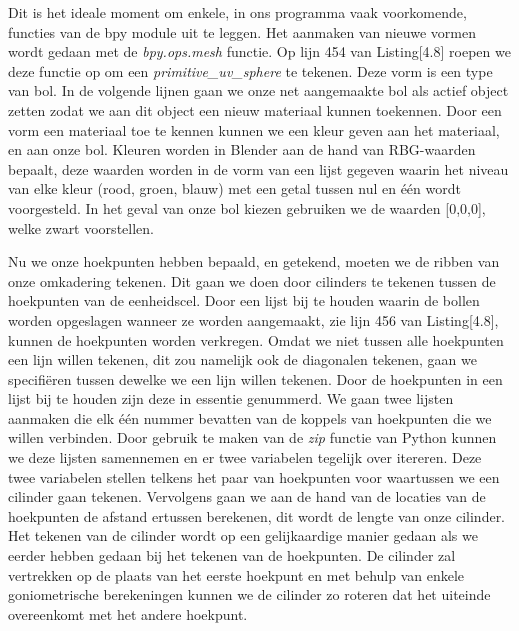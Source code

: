 Dit is het ideale moment om enkele, in ons programma vaak voorkomende, functies van de bpy module uit te leggen. Het aanmaken van nieuwe vormen wordt gedaan met de \textit{bpy.ops.mesh} functie. Op lijn 454 van Listing[4.8] roepen we deze functie op om een \textit{primitive\_uv\_sphere} te tekenen. Deze vorm is een type van bol. In de volgende lijnen gaan we onze net aangemaakte bol als actief object zetten zodat we aan dit object een nieuw materiaal kunnen toekennen. Door een vorm een materiaal toe te kennen kunnen we een kleur geven aan het materiaal, en aan onze bol. Kleuren worden in Blender aan de hand van RBG-waarden bepaalt, deze waarden worden in de vorm van een lijst gegeven waarin het niveau van elke kleur (rood, groen, blauw) met een getal tussen nul en één wordt voorgesteld. In het geval van onze bol kiezen gebruiken we de waarden [0,0,0], welke zwart voorstellen.
\par
Nu we onze hoekpunten hebben bepaald, en getekend, moeten we de ribben van onze omkadering tekenen. Dit gaan we doen door cilinders te tekenen tussen de hoekpunten van de eenheidscel. Door een lijst bij te houden waarin de bollen worden opgeslagen wanneer ze worden aangemaakt, zie lijn 456 van Listing[4.8], kunnen de hoekpunten worden verkregen. Omdat we niet tussen alle hoekpunten een lijn willen tekenen, dit zou namelijk ook de diagonalen tekenen, gaan we specifiëren tussen dewelke we een lijn willen tekenen. Door de hoekpunten in een lijst bij te houden zijn deze in essentie genummerd. We gaan twee lijsten aanmaken die elk één nummer bevatten van de koppels van hoekpunten die we willen verbinden. Door gebruik te maken van de \textit{zip} functie van Python kunnen we deze lijsten samennemen en er twee variabelen tegelijk over itereren. Deze twee variabelen stellen telkens het paar van hoekpunten voor waartussen we een cilinder gaan tekenen. Vervolgens gaan we aan de hand van de locaties van de hoekpunten de afstand ertussen berekenen, dit wordt de lengte van onze cilinder. Het tekenen van de cilinder wordt op een gelijkaardige manier gedaan als we eerder hebben gedaan bij het tekenen van de hoekpunten. De cilinder zal vertrekken op de plaats van het eerste hoekpunt en met behulp van enkele goniometrische berekeningen kunnen we de cilinder zo roteren dat het uiteinde overeenkomt met het andere hoekpunt.
\par



